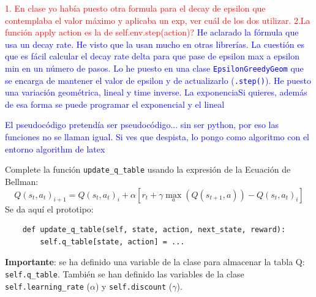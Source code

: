 \documentclass{article}
\begin{document}
\textcolor{red}{1. En clase yo había puesto otra formula para el decay de epsilon que contemplaba el valor máximo y aplicaba un exp, ver cuál de los dos utilizar. 2.La función apply action es la de self.env.step(action)?}
\textcolor{blue}{He aclarado la fórmula que usa un decay rate. He visto que la usan mucho en otras librerías. La cuestión es que es fácil calcular el decay rate delta para que pase de epsilon max a epsilon min en un número de pasos. Lo he puesto en una clase \texttt{EpsilonGreedyGeom} que se encarga de mantener el valor de epsilon y de actualizarlo (\texttt{.step()}). He puesto una variación geométrica, lineal y time inverse. La exponenciaSi quieres, además de esa forma se puede programar el exponencial y el lineal}

\textcolor{blue}{El pseudocódigo pretendía ser pseudocódigo... sin ser python, por eso las funciones no se llaman igual. Si ves que despista, lo pongo como algoritmo con el entorno algorithm de latex}





\begin{exercise}
    Complete la función \texttt{update\_q\_table} usando la expresión de la Ecuación de Bellman:
    \begin{equation}
Q(s_t,a_t)_{i+1} = Q(s_t,a_t)_{i} + \alpha [r_t + \gamma 
\max_a(Q(s_{t+1},a))- Q(s_t,a_t)_{i}]  
\end{equation}
Se da aquí el prototipo:
    \begin{verbatim}
    def update_q_table(self, state, action, next_state, reward):
        self.q_table[state, action] = ...
    \end{verbatim}
    \textbf{Importante}: se ha definido una variable de la clase para almacenar la tabla Q: \texttt{self.q\_table}. También se han definido las variables de la clase \texttt{self.learning\_rate} ($\alpha$) y \texttt{self.discount} ($\gamma$).
\end{exercise}
\end{document}
